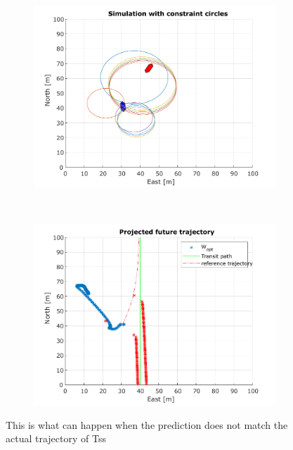 \begin{figure}[b] %
    \centering
    \begin{subfigure}[b]{0.95\textwidth}
        \centering
        \includegraphics[width=\textwidth]{Images/BadPrediction_Caught_in_constraints.pdf}
    \end{subfigure}
    \hfill 
    \\
    \begin{subfigure}[b]{0.95\textwidth}
        \centering
        \includegraphics[width=\textwidth]{images/BadPrediction_w_opt.pdf}
    \end{subfigure}
    \caption{This is what can happen when the prediction does not match the actual trajectory of \gls{Ts}s}
\end{figure}

